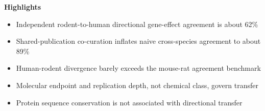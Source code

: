 \documentclass[12pt]{article}
\begin{document}
\noindent \textbf{\large Highlights}

\vspace{8pt}

\begin{itemize}\itemsep6pt
\item Independent rodent-to-human directional gene-effect agreement is about 62\%
\item Shared-publication co-curation inflates naive cross-species agreement to about 89\%
\item Human-rodent divergence barely exceeds the mouse-rat agreement benchmark
\item Molecular endpoint and replication depth, not chemical class, govern transfer
\item Protein sequence conservation is not associated with directional transfer
\end{itemize}
\end{document}
